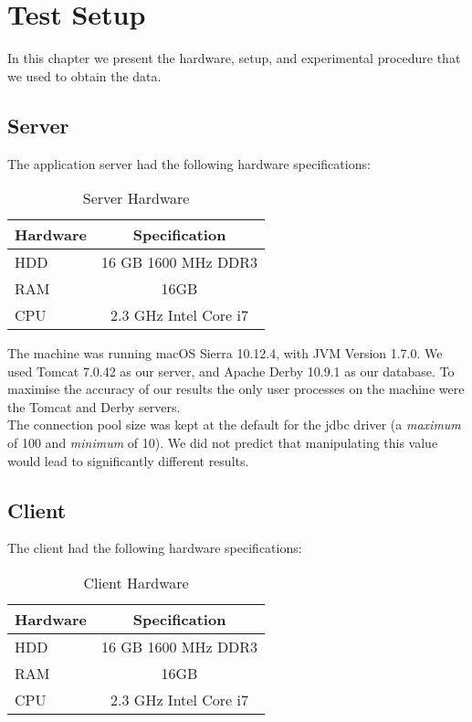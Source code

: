 \documentclass[11pt]{report}
\begin{document}
\chapter{Test Setup}
In this chapter we present the hardware, setup, and experimental procedure that we used to obtain the data.

\section{Server}

The application server had the following hardware specifications:
\begin{table}[htp]
\caption{Server Hardware}
\begin{center}
\begin{tabular}{l | c}
Hardware & Specification \\ \hline
HDD & 16 GB 1600 MHz DDR3 \\
RAM & 16GB \\ 
CPU & 2.3 GHz Intel Core i7 \\
\end{tabular}
\end{center}
\label{default}
\end{table}%

The machine was running macOS Sierra 10.12.4, with JVM Version 1.7.0. We used Tomcat 7.0.42 as our server, and Apache Derby 10.9.1 as our database. To maximise the accuracy of our results the only user processes on the machine were the Tomcat and Derby servers. \\

The connection pool size was kept at the default for the jdbc driver (a \emph{maximum} of 100 and \emph{minimum} of 10). We did not predict that manipulating this value would lead to significantly different results.

\section{Client}

The client had the following hardware specifications:
\begin{table}[htp]
\caption{Client Hardware}
\begin{center}
\begin{tabular}{l | c}
Hardware & Specification \\ \hline
HDD & 16 GB 1600 MHz DDR3 \\
RAM & 16GB \\ 
CPU & 2.3 GHz Intel Core i7 \\
\end{tabular}
\end{center}
\label{default}
\end{table}%
\end{document}
